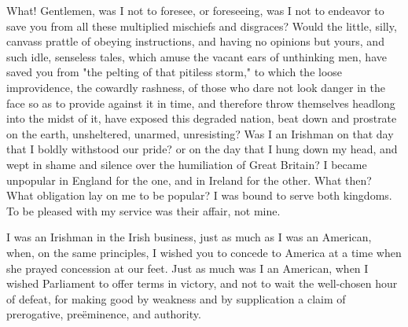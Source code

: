 What! Gentlemen, was I not to foresee, or foreseeing, was I not to endeavor to save you from all these multiplied mischiefs and disgraces? Would the little, silly, canvass prattle of obeying instructions, and having no opinions but yours, and such idle, senseless tales, which amuse the vacant ears of unthinking men, have saved you from "the pelting of that pitiless storm," to which the loose improvidence, the cowardly rashness, of those who dare not look danger in the face so as to provide against it in time, and therefore throw themselves headlong into the midst of it, have exposed this degraded nation, beat down and prostrate on the earth, unsheltered, unarmed, unresisting? Was I an Irishman on that day that I boldly withstood our pride? or on the day that I hung down my head, and wept in shame and silence over the humiliation of Great Britain? I became unpopular in England for the one, and in Ireland for the other. What then? What obligation lay on me to be popular? I was bound to serve both kingdoms. To be pleased with my service was their affair, not mine.

I was an Irishman in the Irish business, just as much as I was an American, when, on the same principles, I wished you to concede to America at a time when she prayed concession at our feet. Just as much was I an American, when I wished Parliament to offer terms in victory, and not to wait the well-chosen hour of defeat, for making good by weakness and by supplication a claim of prerogative, preëminence, and authority.

